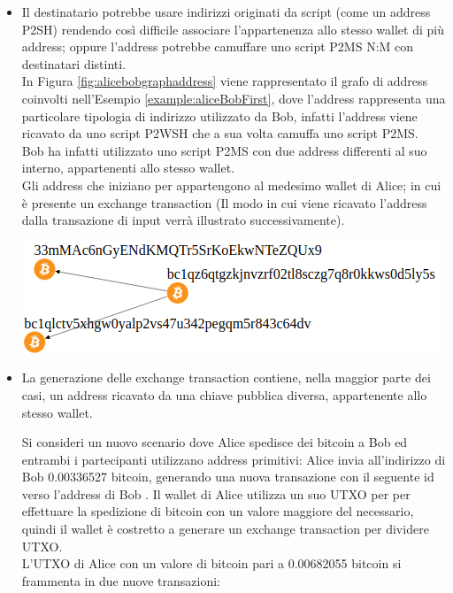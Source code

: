 \begin{itemize}
  \item Il destinatario potrebbe usare indirizzi originati da script (come un address P2SH) rendendo così difficile associare l’appartenenza allo stesso wallet di più address; oppure l’address potrebbe camuffare uno script P2MS N:M con destinatari distinti. \\
  In Figura \ref{fig:alicebobgraphaddress} viene rappresentato il grafo di address coinvolti nell’Esempio \ref{example:aliceBobFirst}, dove l’address  rappresenta una particolare tipologia di indirizzo utilizzato da Bob, infatti l’address viene ricavato da uno script P2WSH che a sua volta camuffa uno script P2MS. \\
  Bob ha infatti utilizzato uno script P2MS con due address differenti al suo interno, appartenenti allo stesso wallet. \\
  Gli address che iniziano per  appartengono al medesimo wallet di Alice; in cui è presente un exchange transaction (Il modo in cui viene ricavato l’address dalla transazione di input verrà illustrato successivamente).

  {\centering
  \vspace{15pt}
  \includegraphics[scale=0.43]{images/exampleWithGraph/exchange-transaction-alice-bob.png}
  \vspace{10pt}
  \par}

  \item La generazione delle exchange transaction contiene, nella maggior parte dei casi, un address ricavato da una chiave pubblica diversa, appartenente allo stesso wallet.
  \begin{example} \label{example:newalicebobaddress}
   Si consideri un nuovo scenario dove Alice spedisce dei bitcoin a Bob ed entrambi i partecipanti utilizzano address primitivi:  Alice invia all’indirizzo di Bob 0.00336527 bitcoin, generando una nuova transazione con il seguente id  verso l’address di Bob .
    Il wallet di Alice utilizza un suo UTXO per per effettuare la spedizione di bitcoin con un valore maggiore del necessario, quindi il wallet è costretto a generare un exchange transaction per dividere UTXO. \\
    L’UTXO di Alice con un valore di bitcoin pari a 0.00682055 bitcoin si frammenta in due nuove transazioni:


\end{example}
\end{itemize}
